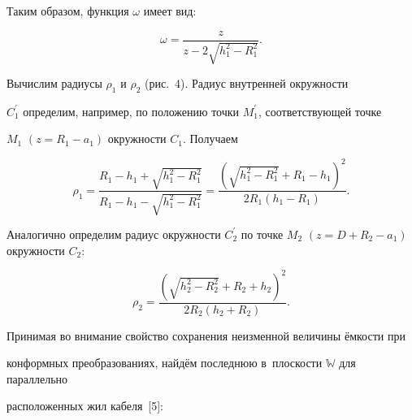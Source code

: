 Таким образом, функция $\omega $ имеет вид:

\begin{equation}

\label{ChostSM:eq9}

\omega = \frac{z}{z - 2\sqrt {h_1 ^2 - R_1 ^2} }.

\end{equation}



Вычислим радиусы $\rho _{1}$ и $\rho _{2}$ (рис.~4). Радиус внутренней окружности 

$C_{1}^\prime $ определим, например, по положению точки $M_{1}^\prime $, соответствующей точке 

$M_{1}$ $(z = R_1 - a_1 )$ окружности $C_{1}$. Получаем

\begin{equation}

\label{ChostSM:eq10}

\rho _1 = \frac{R_1 - h_1 + \sqrt {h_1 ^2 - R_1 ^2} }{R_1 - h_1 - \sqrt {h_1 

^2 - R_1 ^2} } = \frac{\left( {\sqrt {h_1 ^2 - R_1 ^2} + R_1 - h_1 } 

\right)^2}{2R_1 (h_1 - R_1 )}.

\end{equation}

Аналогично определим радиус окружности $C_{2}^\prime $ по точке $M_{2}$ $(z = D + R_2 - 

a_1 )$ окружности $C_{2 }$:

\begin{equation}

\label{ChostSM:eq11}

\rho _2 = \frac{\left( {\sqrt {h_2 ^2 - R_2 ^2} + R_2 + h_2 } 

\right)^2}{2R_2 (h_2 + R_2 )}.

\end{equation}



Принимая во внимание свойство сохранения неизменной величины ёмкости при 

конформных преобразованиях, найдём последнюю в~плоскости $\mathbb W$ для параллельно 

расположенных жил кабеля~[5]:

